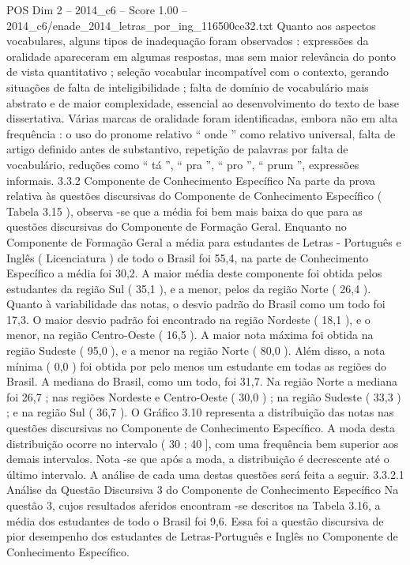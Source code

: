 \begin{textsample}{POS Dim 2 – 2014\_c6 – Score 1.00 – 2014\_c6/enade\_2014\_letras\_por\_ing\_116500ce32.txt}
Quanto aos aspectos vocabulares, alguns tipos de inadequação foram observados : expressões da oralidade apareceram em algumas respostas, mas sem maior relevância do ponto de vista quantitativo ; seleção vocabular incompatível com o contexto, gerando situações de falta de inteligibilidade ; falta de domínio de vocabulário mais abstrato e de maior complexidade, essencial ao desenvolvimento do texto de base dissertativa.
Várias marcas de oralidade foram identificadas, embora não em alta frequência : o uso do pronome relativo “ onde ” como relativo universal, falta de artigo definido antes de substantivo, repetição de palavras por falta de vocabulário, reduções como “ tá ”, “ pra ”, “ pro ”, “ prum ”, expressões informais. 3.3.2 Componente de Conhecimento Específico Na parte da prova relativa às questões discursivas do Componente de Conhecimento Específico ( Tabela 3.15 ), observa -se que a média foi bem mais baixa do que para as questões discursivas do Componente de Formação Geral.
Enquanto no Componente de Formação Geral a média para estudantes de Letras - Português e Inglês ( Licenciatura ) de todo o Brasil foi 55,4, na parte de Conhecimento Específico a média foi 30,2.
A maior média deste componente foi obtida pelos estudantes da região Sul ( 35,1 ), e a menor, pelos da região Norte ( 26,4 ).
Quanto à variabilidade das notas, o desvio padrão do Brasil como um todo foi 17,3.
O maior desvio padrão foi encontrado na região Nordeste ( 18,1 ), e o menor, na região Centro-Oeste ( 16,5 ).
A maior nota máxima foi obtida na região Sudeste ( 95,0 ), e a menor na região Norte ( 80,0 ).
Além disso, a nota mínima ( 0,0 ) foi obtida por pelo menos um estudante em todas as regiões do Brasil.
A mediana do Brasil, como um todo, foi 31,7.
Na região Norte a mediana foi 26,7 ; nas regiões Nordeste e Centro-Oeste ( 30,0 ) ; na região Sudeste ( 33,3 ) ; e na região Sul ( 36,7 ).
O Gráfico 3.10 representa a distribuição das notas nas questões discursivas no Componente de Conhecimento Específico.
A moda desta distribuição ocorre no intervalo ( 30 ; 40 ], com uma frequência bem superior aos demais intervalos.
Nota -se que após a moda, a distribuição é decrescente até o último intervalo.
A análise de cada uma destas questões será feita a seguir. 3.3.2.1 Análise da Questão Discursiva 3 do Componente de Conhecimento Específico Na questão 3, cujos resultados aferidos encontram -se descritos na Tabela 3.16, a média dos estudantes de todo o Brasil foi 9,6.
Essa foi a questão discursiva de pior desempenho dos estudantes de Letras-Português e Inglês no Componente de Conhecimento Específico.

\end{textsample}
